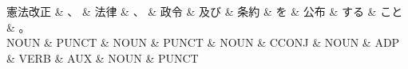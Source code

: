 \documentclass[tikz,border=5pt]{standalone}
\begin{document}
\normalsize
\begin{dependency}[edge unit distance=12.0pt]
    \begin{deptext}[column sep=1em]
        憲法改正 \& 、 \& 法律 \& 、 \& 政令 \& 及び \& 条約 \& を \& 公布 \& する \& こと \& 。\\
        NOUN \& PUNCT \& NOUN \& PUNCT \& NOUN \& CCONJ \& NOUN \& ADP \& VERB \& AUX \& NOUN \& PUNCT\\
    \end{deptext}
\end{dependency}
\end{document}
